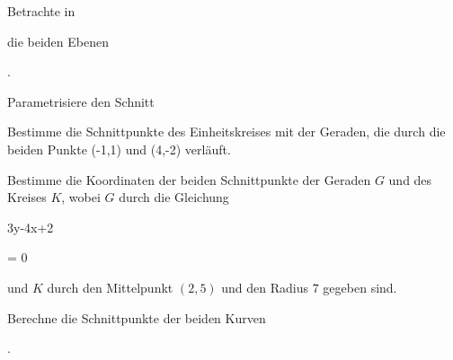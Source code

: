 \setcounter{section}{2}






{}


{


Betrachte in


 die beiden Ebenen


 { . }


Parametrisiere den Schnitt




}


{} {}




{}


{


Bestimme die Schnittpunkte des Einheitskreises mit der Geraden, die durch die beiden Punkte
\mathkor {} {(-1,1)} {und} {(4,-2)} {}
verläuft.


}


{} {}




{}


{


Bestimme die Koordinaten der beiden Schnittpunkte der Geraden $G$ und des Kreises $K$, wobei $G$ durch die Gleichung


\mavergleichskette


{\vergleichskette


{ 3y-4x+2
}


{ = }{ 0
}


{  }{
}


{    }{
}


{   }{
}


}
{}{}{}
und $K$ durch den Mittelpunkt $(2,5)$ und den Radius $7$ gegeben sind.


}


{} {}




{}


{


Berechne die Schnittpunkte der beiden Kurven


 { . }


}


{} {}




